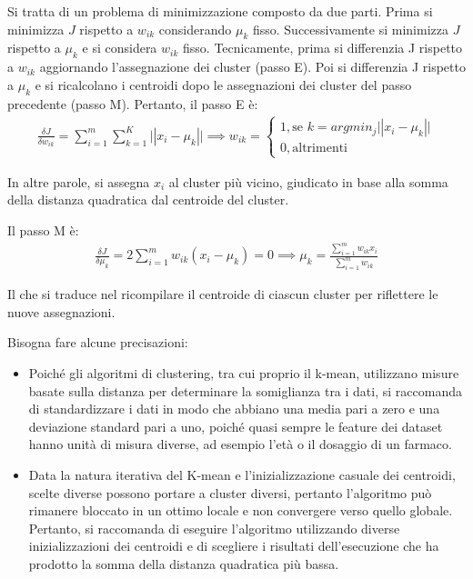 Si tratta di un problema di minimizzazione composto da due parti. Prima si minimizza $J$ rispetto a $w_{ik}$ considerando $\mu_k$ fisso. Successivamente si minimizza $J$ rispetto a $\mu_k$ e si considera $w_{ik}$ fisso. Tecnicamente, prima si differenzia J rispetto a $w_{ik}$ aggiornando l'assegnazione dei cluster (passo E). Poi si differenzia J rispetto a $\mu_k$ e si ricalcolano i centroidi dopo le assegnazioni dei cluster del passo precedente (passo M). Pertanto, il passo E è:
\begin{align*}
	\frac{\delta J}{\delta w_{ik}} = \sum_{i=1}^{m} \sum_{k=1}^{K} \vert|x_i - \mu_k|\vert 
	\implies w_{ik} = \begin{cases}
		1, \text{se }  k=argmin_j \vert|x_i - \mu_k|\vert \\
		0, \text{altrimenti}
	\end{cases}
\end{align*}

In altre parole, si assegna $x_i$ al cluster più vicino, giudicato in base alla somma della distanza quadratica dal centroide del cluster.

Il passo M è:
\begin{align*}
\frac{\delta J}{\delta \mu_k} = 2\sum_{i=1}^{m} w_{ik}(x_i - \mu_k) = 0
\implies \mu_k = \frac{\sum_{i=1}^{m} w_{ik}x_i}{\sum_{i=1}^{m} w_{ik}}
\end{align*}

Il che si traduce nel ricompilare il centroide di ciascun cluster per riflettere le nuove assegnazioni.

Bisogna fare alcune precisazioni:
\begin{itemize}
	\item Poiché gli algoritmi di clustering, tra cui proprio il k-mean, utilizzano misure basate sulla distanza per determinare la somiglianza tra i dati, si raccomanda di standardizzare i dati in modo che abbiano una media pari a zero e una deviazione standard pari a uno, poiché quasi sempre le feature dei dataset hanno unità di misura diverse, ad esempio l'età o il dosaggio di un farmaco.
	\item Data la natura iterativa del K-mean e l'inizializzazione casuale dei centroidi, scelte diverse possono portare a cluster diversi, pertanto  l'algoritmo può rimanere bloccato in un ottimo locale e non convergere verso quello globale. Pertanto, si raccomanda di eseguire l'algoritmo utilizzando diverse inizializzazioni dei centroidi e di scegliere i risultati dell'esecuzione che ha prodotto la somma della distanza quadratica più bassa.
\end{itemize}

